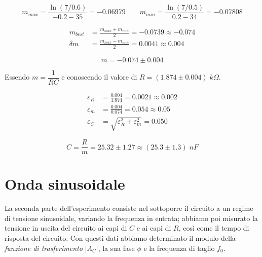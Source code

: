\documentclass[11pt, a4paper]{article}
\numberwithin{equation}{section} %
\begin{document}
\begin{equation*}
    m_{max} = \frac{\ln(7/0.6)}{- 0.2 - 35} = - 0.06979
    \qquad
    m_{min} = \frac{\ln(7/0.5)}{0.2 - 34} = - 0.07808
\end{equation*}

\begin{align*}
    m_{best} &= \frac{m_{max} + m_{min}}{2} = - 0.0739 \approx - 0.074 \\
    \delta m &= \frac{m_{max} - m_{min}}{2} = 0.0041 \approx 0.004
\end{align*}

\begin{equation}
    m = - 0.074 \pm 0.004
\end{equation}

\newpage

Essendo \(m = \dfrac{1}{RC}\) e conoscendo il valore di \(R = (1.874 \pm 0.004) \; \unit{k\Omega}\).

\begin{align*}
    \varepsilon_R &= \frac{0.004}{1.874} = 0.0021 \approx 0.002 \\
    \varepsilon_m &= \frac{0.004}{0.074} = 0.054 \approx 0.05 \\
    \varepsilon_C &= \sqrt{\varepsilon_R^{2} + \varepsilon_m^{2}} = 0.050 %
\end{align*}

\begin{equation}
    C = \frac{R}{m} = 25.32 \pm 1.27 \approx (25.3 \pm 1.3) \; \unit{nF}
\end{equation}

\section{Onda sinusoidale}

La seconda parte dell'esperimento consiste nel sottoporre il circuito a un regime di tensione sinusoidale, variando la frequenza in entrata; abbiamo poi misurato la tensione in uscita del circuito ai capi di $C$ e ai capi di $R$, così come il tempo di risposta del circuito. Con questi dati abbiamo determinato il modulo della \emph{funzione di trasferimento} $|A_{C}|$, la sua fase $\phi$ e la frequenza di taglio $f_{0}$.

\end{document}
